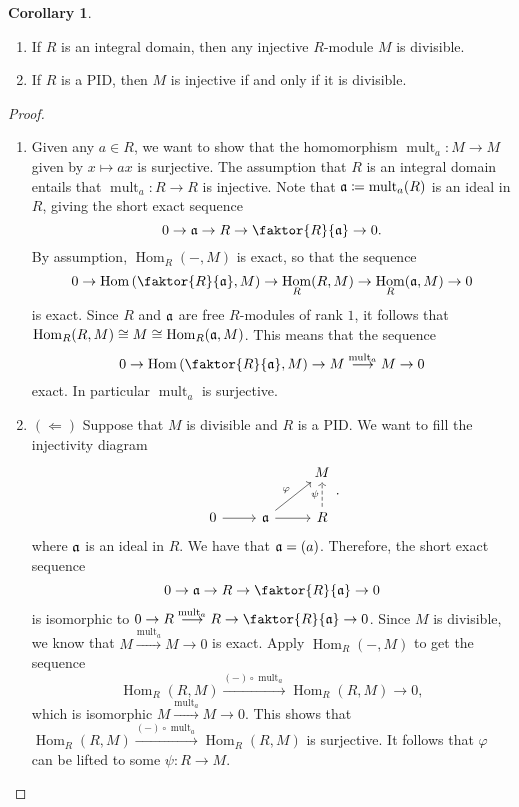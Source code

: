 \documentclass[10pt,letterpaper,cm]{nupset}
\theoremstyle{definition}
\theoremstyle{theorem}
\newtheorem{corollary}[definition]{Corollary}
\theoremstyle{remark}
\newcommand{\1}{\mathbf{1}}
\newcommand{\0}{\vec 0}
\DeclareMathOperator{\Hom}{Hom}
\DeclareMathOperator{\mult}{mult}
\begin{document}
\begin{corollary} $ $
\begin{enumerate}
\item If $R$ is an integral domain, then any injective $R$-module $M$ is divisible.
\item If $R$ is a PID, then $M$ is injective if and only if it is divisible.
\end{enumerate}
\end{corollary}
\begin{proof} $ $
\begin{enumerate}
\item Given any $a\in R$, we want to show that the homomorphism $\mult_a : M \to M$ given by $x\mapsto ax$ is surjective. The assumption that $R$ is an integral domain entails that $\mult_a : R\to R$ is injective. Note that $\frak{a}\coloneqq  \mult_a(R)$ is an ideal in $R$, giving the short exact sequence $$0 \to \frak{a} \to R \to \faktor{R}{\frak{a}}\to 0.  $$ By assumption, $\Hom_R(-, M)$ is exact, so that the sequence $$0 \to \Hom\left(\faktor{R}{\frak{a}}, M \right) \to \Hom_R(R, M) \to \Hom_R(\frak{a}, M) \to 0   $$ is exact. Since $R$ and $\frak{a}$ are free $R$-modules of rank $1$, it follows that $\Hom_R(R, M) \cong M \cong  \Hom_R(\frak{a}, M)$. This means that the sequence  $$0 \to \Hom\left(\faktor{R}{\frak{a}}, M \right) \to M \overset{\mult_a}{\longrightarrow} M \to 0 $$ exact. In particular $\mult_a$ is surjective.

\item $(\Longleftarrow)$ Suppose that $M$ is divisible and $R$ is a PID. We want to fill the injectivity diagram
\[
\begin{tikzcd}
 &  & M \\
0 \arrow[r] & \frak{a} \arrow[r] \arrow[ru, "\varphi"] & R \arrow[u, "\psi", dashed]
\end{tikzcd}.
\]
where $\frak{a}$ is an ideal in $R$. We have that $\frak{a} = \left(a\right)$. Therefore, the short exact sequence $$0 \to \frak{a} \to R \to \faktor{R}{\frak{a}} \to 0$$ is isomorphic to $0 \to R \overset{\mult_a}{\longrightarrow} R \to \faktor{R}{\frak{a}}\to 0$. Since $M$ is divisible, we know that $M \overset{\mult_a}{\longrightarrow} M \to 0$ is exact.  Apply $\Hom_R(-, M)$ to get the sequence $$\Hom_R(R, M) \overset{(-)\circ \mult_a}{\longrightarrow} \Hom_R(R, M) \to 0,$$ which is isomorphic $M \overset{\mult_a}{\longrightarrow} M \to 0$. This shows that $\Hom_R(R, M) \overset{(-)\circ \mult_a}{\longrightarrow} \Hom_R(R, M)$ is surjective. It follows that $\varphi$ can be lifted to some $\psi : R \to M$.
\end{enumerate}
\end{proof}
\end{document}
